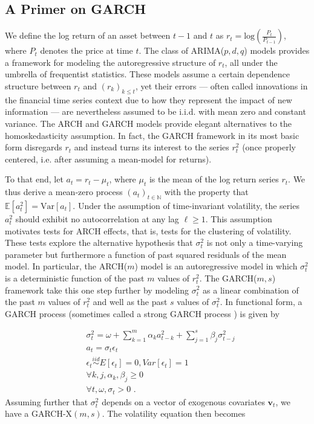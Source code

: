 \documentclass[11pt,3p,review,authoryear]{elsarticle}
\newcommand{\x}{\textbf{v}}
\newcommand{\simiid}{\stackrel{iid}{\sim}} %
\def\mrm#1{\mathrm{#1}} %
\def\E{\mathbb{E}} %
\theoremstyle{definition}
\begin{document}
  \subsection{A Primer on GARCH}
We define the log return of an asset between $t-1$ and $t$ as $r_{t} = \text{log}(\frac{P_{t}}{P_{t-1}})$, where $P_{t}$ denotes the price at time $t$.  The class of ARIMA($p,d,q$) models  \citep{box2013box} provides a framework for modeling the autoregressive structure of $r_{t}$, all under the umbrella of frequentist statistics.  These models assume a certain dependence structure between $r_{t}$ and $(r_{k})_{k\leq t}$, yet their errors --- often called innovations in the financial time series context due to how they represent the impact of new information --- are nevertheless assumed to be i.i.d. with mean zero and constant variance.  The ARCH \citep{engle1982autoregressive} and GARCH \citep{bollerslev1986generalized} models provide elegant alternatives to the homoskedasticity assumption.  In fact, the GARCH framework in its most basic form disregards $r_{t}$ and instead turns its interest to the series $r_{t}^{2}$ (once properly centered, i.e. after assuming a mean-model for returns).  

To that end, let $a_{t} = r_{t} - \mu_{t}$, where $\mu_{t}$ is the mean of the log return series $r_{t}$.  We thus derive a mean-zero process $(a_{t})_{t\in\mathbb{N}}$ with the property that $\E[a^{2}_{t}] = \mrm{Var}[a_{t}]$.  Under the assumption of time-invariant volatility, the series $a_{t}^{2}$ should exhibit no autocorrelation at any lag $\ell\geq1$.  This assumption motivates tests for ARCH effects, that is, tests for the clustering of volatility.  These tests explore the alternative hypothesis that $\sigma_{t}^{2}$ is not only a time-varying parameter but furthermore a function of past squared residuals of the mean model.  In particular, the ARCH($m$) model is an autoregressive model in which $\sigma_{t}^{2}$ is a deterministic function of the past $m$ values of $r_{t}^{2}$.  The GARCH($m,s$) framework take this one step further by modeling $\sigma_{t}^{2}$ as a linear combination of the past $m$ values of $r_{t}^{2}$ and well as the past $s$ values of $\sigma_{t}^{2}$.  In functional form, a GARCH process (sometimes called a strong GARCH process \citep[p. 19]{francq2019garch}) is given by

\begin{align*}
&\sigma_{t}^{2} = \omega + \sum^{m}_{k=1}\alpha_{k}a^{2}_{t-k} + \sum_{j=1}^{s}\beta_{j}\sigma_{t-j}^{2}\\
&a_{t} = \sigma_{t}\epsilon_{t}\\
&\epsilon_{t} \simiid E[\epsilon_{t}]=0, Var[\epsilon_{t}] = 1\\
&\forall k,j, \alpha_{k},\beta_{j}\geq 0\\ 
&\forall t, \omega, \sigma_{t} > 0 \text { .} 
\end{align*}
Assuming further that $\sigma^{2}_{t}$ depends on a vector of exogenous covariates $\x_{t}$, we have a  GARCH-X$(m,s)$.  The volatility equation then becomes 
\end{document}
